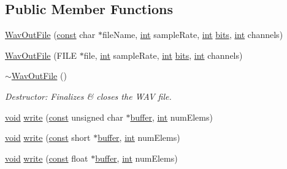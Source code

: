 \subsection*{Public Member Functions}
\begin{DoxyCompactItemize}
\item 
\hyperlink{class_wav_out_file_a119ba48b344ba94ced96fc27dace13ec}{Wav\+Out\+File} (\hyperlink{getopt1_8c_a2c212835823e3c54a8ab6d95c652660e}{const} char $\ast$file\+Name, \hyperlink{xmltok_8h_a5a0d4a5641ce434f1d23533f2b2e6653}{int} sample\+Rate, \hyperlink{xmltok_8h_a5a0d4a5641ce434f1d23533f2b2e6653}{int} \hyperlink{metrics_8c_a1eb8fc809d37cc6176f7f27374b063d0}{bits}, \hyperlink{xmltok_8h_a5a0d4a5641ce434f1d23533f2b2e6653}{int} channels)
\item 
\hyperlink{class_wav_out_file_a23cc85bf80351e565f0d3466420a57da}{Wav\+Out\+File} (F\+I\+LE $\ast$file, \hyperlink{xmltok_8h_a5a0d4a5641ce434f1d23533f2b2e6653}{int} sample\+Rate, \hyperlink{xmltok_8h_a5a0d4a5641ce434f1d23533f2b2e6653}{int} \hyperlink{metrics_8c_a1eb8fc809d37cc6176f7f27374b063d0}{bits}, \hyperlink{xmltok_8h_a5a0d4a5641ce434f1d23533f2b2e6653}{int} channels)
\item 
\hyperlink{class_wav_out_file_a34aac0b1df2cfbdb5b64a87022014e64}{$\sim$\+Wav\+Out\+File} ()
\begin{DoxyCompactList}\small\item\em Destructor\+: Finalizes \& closes the W\+AV file. \end{DoxyCompactList}\item 
\hyperlink{sound_8c_ae35f5844602719cf66324f4de2a658b3}{void} \hyperlink{class_wav_out_file_a6916ab4978f245954a0c932a043acc5c}{write} (\hyperlink{getopt1_8c_a2c212835823e3c54a8ab6d95c652660e}{const} unsigned char $\ast$\hyperlink{structbuffer}{buffer}, \hyperlink{xmltok_8h_a5a0d4a5641ce434f1d23533f2b2e6653}{int} num\+Elems)
\item 
\hyperlink{sound_8c_ae35f5844602719cf66324f4de2a658b3}{void} \hyperlink{class_wav_out_file_ad5aecaf3a6856ee3cdc8912bcb77d6f9}{write} (\hyperlink{getopt1_8c_a2c212835823e3c54a8ab6d95c652660e}{const} short $\ast$\hyperlink{structbuffer}{buffer}, \hyperlink{xmltok_8h_a5a0d4a5641ce434f1d23533f2b2e6653}{int} num\+Elems)
\item 
\hyperlink{sound_8c_ae35f5844602719cf66324f4de2a658b3}{void} \hyperlink{class_wav_out_file_a428d1342491a902ce90bc5cf0a01c309}{write} (\hyperlink{getopt1_8c_a2c212835823e3c54a8ab6d95c652660e}{const} float $\ast$\hyperlink{structbuffer}{buffer}, \hyperlink{xmltok_8h_a5a0d4a5641ce434f1d23533f2b2e6653}{int} num\+Elems)
\end{DoxyCompactItemize}
